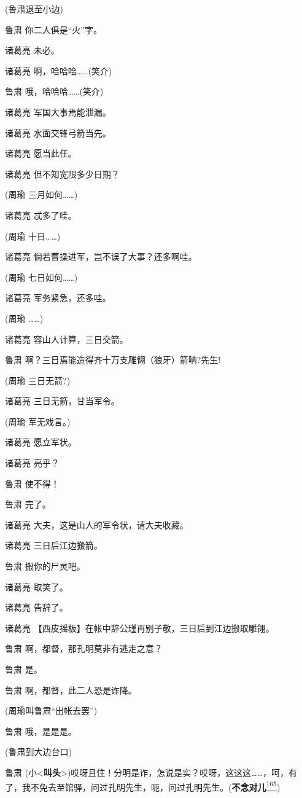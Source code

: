 (鲁肃退至小边)

鲁肃 你二人俱是``火''字。

诸葛亮 未必。

诸葛亮 啊，哈哈哈\ldots{}\ldots{}(笑介)

鲁肃 哦，哈哈哈\ldots{}\ldots{}(笑介)

诸葛亮 军国大事焉能泄漏。

诸葛亮 水面交锋弓箭当先。

诸葛亮 愿当此任。

诸葛亮 但不知宽限多少日期？

(周瑜 三月如何\ldots{}\ldots{})

诸葛亮 忒多了哇。

(周瑜 十日\ldots{}\ldots{})

诸葛亮 倘若曹操进军，岂不误了大事？还多啊哇。

(周瑜 七日如何\ldots{}\ldots{})

诸葛亮 军务紧急，还多哇。

(周瑜 \ldots{}\ldots{})

诸葛亮 容山人计算，三日交箭。

鲁肃 啊？三日焉能造得齐十万支雕翎（狼牙）箭呐?先生!

(周瑜 三日无箭?)

诸葛亮 三日无箭，甘当军令。

(周瑜 军无戏言。)

诸葛亮 愿立军状。

诸葛亮 亮乎？

鲁肃 使不得！

鲁肃 完了。

诸葛亮 大夫，这是山人的军令状，请大夫收藏。

诸葛亮 三日后江边搬箭。

鲁肃 搬你的尸灵吧。

诸葛亮 取笑了。

诸葛亮 告辞了。

诸葛亮 【西皮摇板】在帐中辞公瑾再别子敬，三日后到江边搬取雕翎。

鲁肃 啊，都督，那孔明莫非有逃走之意？

鲁肃 是。

鲁肃 啊，都督，此二人恐是诈降。

(周瑜叫鲁肃``出帐去罢'')

鲁肃 哦，是是是。

(鲁肃到大边台口)

鲁肃
(小\textless{}\textbf{叫头}\textgreater{})哎呀且住！分明是诈，怎说是实？哎呀，这这这\ldots{}\ldots{}，呵，有了，我不免去至馆驿，问过孔明先生，呃，问过孔明先生。(\textbf{不念对儿}\protect\hyperlink{fn165}{\textsuperscript{165}})


